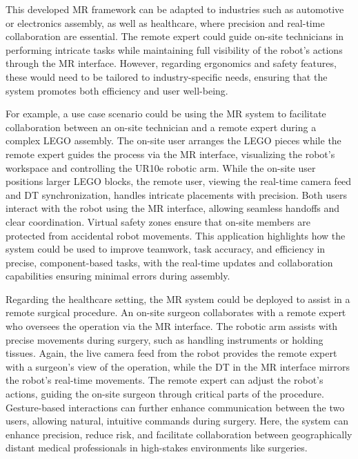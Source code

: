 This developed \ac{MR} framework can be adapted to industries such as automotive or electronics assembly, as well as healthcare, where precision and real-time collaboration are essential. The remote expert could guide on-site technicians in performing intricate tasks while maintaining full visibility of the robot’s actions through the \ac{MR} interface. However, regarding ergonomics and safety features, these would need to be tailored to industry-specific needs, ensuring that the system promotes both efficiency and user well-being.

For example, a use case scenario could be using the \ac{MR} system to facilitate collaboration between an on-site technician and a remote expert during a complex LEGO assembly. The on-site user arranges the LEGO pieces while the remote expert guides the process via the \ac{MR} interface, visualizing the robot’s workspace and controlling the UR10e robotic arm. While the on-site user positions larger LEGO blocks, the remote user, viewing the real-time camera feed and \ac{DT} synchronization, handles intricate placements with precision. Both users interact with the robot using the \ac{MR} interface, allowing seamless handoffs and clear coordination. Virtual safety zones ensure that on-site members are protected from accidental robot movements. This application highlights how the system could be used to improve teamwork, task accuracy, and efficiency in precise, component-based tasks, with the real-time updates and collaboration capabilities ensuring minimal errors during assembly.

Regarding the healthcare setting, the \ac{MR} system could be deployed to assist in a remote surgical procedure. An on-site surgeon collaborates with a remote expert who oversees the operation via the \ac{MR} interface. The robotic arm assists with precise movements during surgery, such as handling instruments or holding tissues. Again, the live camera feed from the robot provides the remote expert with a surgeon’s view of the operation, while the \ac{DT} in the \ac{MR} interface mirrors the robot's real-time movements. The remote expert can adjust the robot’s actions, guiding the on-site surgeon through critical parts of the procedure. Gesture-based interactions can further enhance communication between the two users, allowing natural, intuitive commands during surgery. Here, the system can enhance precision, reduce risk, and facilitate collaboration between geographically distant medical professionals in high-stakes environments like surgeries.








